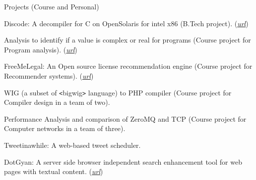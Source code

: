 \documentclass{resume} %
\begin{document}
\begin{rSection}{Projects (Course and Personal)}
\smallskip
\begin{lSubsection}
	\item Discode: A decompiler for C on OpenSolaris for intel x86 (B.Tech project).
			(\href{http://vineetkumar.net/discode/}{\em{url}})
    \item Analysis to identify if a value is complex or real for \matlab programs (Course project for Program analysis).
    (\href{https://github.com/Sable/mclab/tree/master/languages/Natlab/src/natlab/tame/valueanalysis/components/isComplex}{\em{url}}) 
    \item FreeMeLegal: An Open source license recommendation engine (Course project for Recommender systems). 
    (\href{http://vineetkumar.net/freeMeLegal/free-me-legal_final_report.pdf}{\em{url}})
    \item WIG (a subset of \verb+<+bigwig\verb+>+ language) to PHP compiler (Course project for Compiler design in a team of two).
    \item Performance Analysis and comparison of ZeroMQ and TCP (Course project  for Computer networks in a team of three).
    \item Tweetinawhile: A web-based tweet scheduler.
    \item DotGyan: A server side browser independent search enhancement tool for web pages with textual content.
    (\href{http://vineetkumar.net/dotgyan/}{\em{url}})
\end{lSubsection}
\end{rSection}

\end{document}
